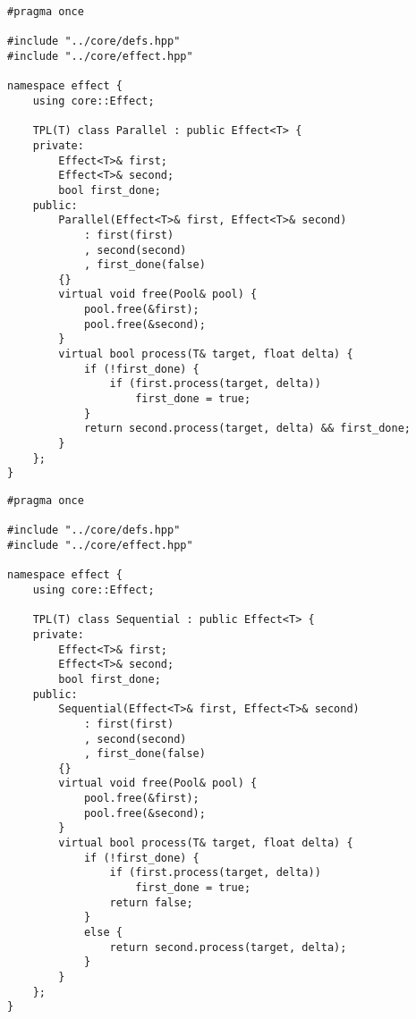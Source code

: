 \begin{lstlisting}[caption=effect/parallel.hpp]
#pragma once

#include "../core/defs.hpp"
#include "../core/effect.hpp"

namespace effect {
    using core::Effect;

    TPL(T) class Parallel : public Effect<T> {
    private:
        Effect<T>& first;
        Effect<T>& second;
        bool first_done;
    public:
        Parallel(Effect<T>& first, Effect<T>& second)
            : first(first)
            , second(second)
            , first_done(false)
        {}
        virtual void free(Pool& pool) {
            pool.free(&first);
            pool.free(&second);
        }
        virtual bool process(T& target, float delta) {
            if (!first_done) {
                if (first.process(target, delta))
                    first_done = true;
            }
            return second.process(target, delta) && first_done;
        }
    };
}
\end{lstlisting}

\begin{lstlisting}[caption=effect/sequential.hpp]
#pragma once

#include "../core/defs.hpp"
#include "../core/effect.hpp"

namespace effect {
    using core::Effect;

    TPL(T) class Sequential : public Effect<T> {
    private:
        Effect<T>& first;
        Effect<T>& second;
        bool first_done;
    public:
        Sequential(Effect<T>& first, Effect<T>& second)
            : first(first)
            , second(second)
            , first_done(false)
        {}
        virtual void free(Pool& pool) {
            pool.free(&first);
            pool.free(&second);
        }
        virtual bool process(T& target, float delta) {
            if (!first_done) {
                if (first.process(target, delta))
                    first_done = true;
                return false;
            }
            else {
                return second.process(target, delta);
            }
        }
    };
}
\end{lstlisting}

